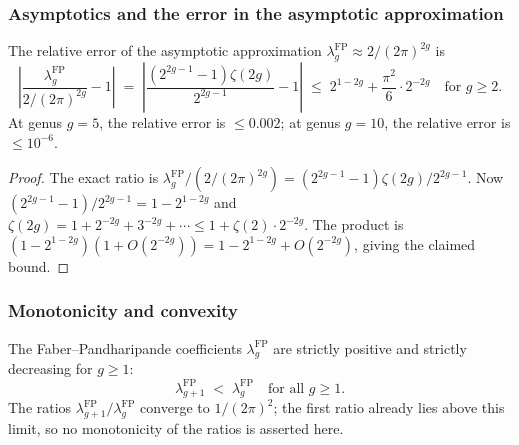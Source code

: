 \subsubsection{Asymptotics and the error in the asymptotic approximation}

\begin{proposition}
The relative error of the asymptotic approximation $\lambda_g^{\mathrm{FP}} \approx 2/(2\pi)^{2g}$ is
\begin{equation}%
\left|\frac{\lambda_g^{\mathrm{FP}}}{2/(2\pi)^{2g}} - 1\right| \;=\; \left|\frac{(2^{2g-1}-1)\zeta(2g)}{2^{2g-1}} - 1\right| \;\leq\; 2^{1-2g} + \frac{\pi^2}{6} \cdot 2^{-2g} \quad\text{for } g \geq 2.
\end{equation}
At genus $g = 5$, the relative error is $\leq 0.002$; at genus $g = 10$, the relative error is $\leq 10^{-6}$.
\end{proposition}

\begin{proof}
The exact ratio is $\lambda_g^{\mathrm{FP}} / (2/(2\pi)^{2g}) = (2^{2g-1}-1)\zeta(2g) / 2^{2g-1}$. Now $(2^{2g-1}-1)/2^{2g-1} = 1 - 2^{1-2g}$ and $\zeta(2g) = 1 + 2^{-2g} + 3^{-2g} + \cdots \leq 1 + \zeta(2) \cdot 2^{-2g}$. The product is $(1-2^{1-2g})(1 + O(2^{-2g})) = 1 - 2^{1-2g} + O(2^{-2g})$, giving the claimed bound.
\end{proof}

\subsubsection{Monotonicity and convexity}

\begin{proposition}
The Faber--Pandharipande coefficients $\lambda_g^{\mathrm{FP}}$ are strictly positive and strictly decreasing for $g \geq 1$:
\begin{equation}%
\lambda_{g+1}^{\mathrm{FP}} \;<\; \lambda_g^{\mathrm{FP}} \quad\text{for all } g \geq 1.
\end{equation}
The ratios $\lambda_{g+1}^{\mathrm{FP}}/\lambda_g^{\mathrm{FP}}$
converge to $1/(2\pi)^2$; the first ratio already lies above this
limit, so no monotonicity of the ratios is asserted here.
\end{proposition}

